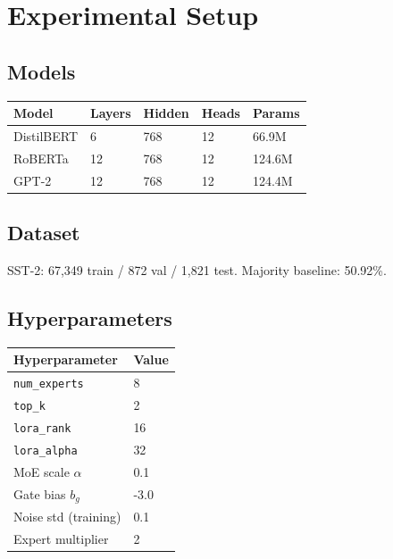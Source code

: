 \section{Experimental Setup}

\subsection{Models}

\begin{table}[H]
\centering
\small
\begin{tabular}{lllll}
\toprule
\textbf{Model} & \textbf{Layers} & \textbf{Hidden} & \textbf{Heads} & \textbf{Params} \\
\midrule
DistilBERT & 6 & 768 & 12 & 66.9M \\
RoBERTa & 12 & 768 & 12 & 124.6M \\
GPT-2 & 12 & 768 & 12 & 124.4M \\
\bottomrule
\end{tabular}
\end{table}

\subsection{Dataset}

SST-2: 67,349 train / 872 val / 1,821 test. Majority baseline: 50.92\%.

\subsection{Hyperparameters}

\begin{table}[H]
\centering
\small
\begin{tabular}{ll}
\toprule
\textbf{Hyperparameter} & \textbf{Value} \\
\midrule
\texttt{num\_experts} & 8 \\
\texttt{top\_k} & 2 \\
\texttt{lora\_rank} & 16 \\
\texttt{lora\_alpha} & 32 \\
MoE scale $\alpha$ & 0.1 \\
Gate bias $b_g$ & -3.0 \\
Noise std (training) & 0.1 \\
Expert multiplier & 2 \\
\bottomrule
\end{tabular}
\end{table}

